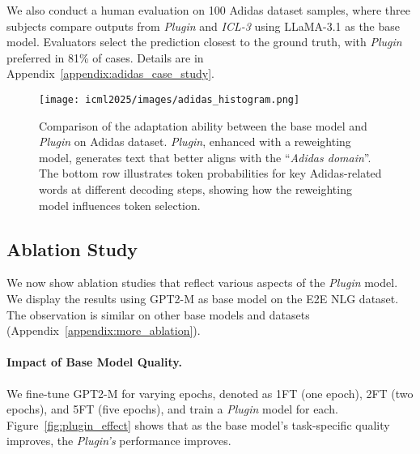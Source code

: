 We also conduct a human evaluation on 100 Adidas dataset samples, where three subjects compare outputs from \textit{Plugin} and \textit{ICL-3} using LLaMA-3.1 as the base model. Evaluators select the prediction closest to the ground truth, with \textit{Plugin} preferred in 81\% of cases. Details are in Appendix~\ref{appendix:adidas_case_study}.

\begin{figure*}[t]
    \centering
    \texttt{[image: icml2025/images/adidas\_histogram.png]}
    \vspace{-6mm}
    \caption{Comparison of the adaptation ability between the base model and \textit{Plugin} on Adidas dataset. \textit{Plugin}, enhanced with a reweighting model, generates text that better aligns with the ``\textit{Adidas domain}''. The bottom row illustrates token probabilities for key Adidas-related words at different decoding steps, showing how the reweighting model influences token selection.}
    \label{fig:adidas_decoding}
\end{figure*}


\subsection{Ablation Study}
\label{ssec:ablation}
 We now show ablation studies that reflect various aspects of the \textit{Plugin} model. We display the results using GPT2-M as base model on the E2E NLG dataset. The observation is similar on other base models and datasets (Appendix~\ref{appendix:more_ablation}).

\paragraph{Impact of Base Model Quality.}  
We fine-tune GPT2-M  for varying epochs, denoted as 1FT (one epoch), 2FT (two epochs), and 5FT (five epochs), and train a \textit{Plugin} model for each. Figure~\ref{fig:plugin_effect} shows that as the base model's task-specific quality improves, the \textit{Plugin's} performance improves.

